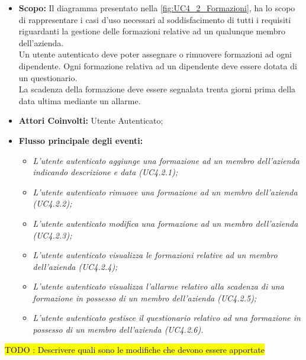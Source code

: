 		\begin{itemize}
			\item \textbf{Scopo:} Il diagramma presentato nella \autoref{fig:UC4_2_Formazioni}, ha lo scopo di rappresentare i casi d'uso necessari al soddisfacimento di tutti i requisiti riguardanti la gestione delle formazioni relative ad un qualunque membro dell'azienda. \\ 
			Un utente autenticato deve poter assegnare o rimuovere formazioni ad ogni dipendente. 
			Ogni formazione relativa ad un dipendente deve essere dotata di un questionario. \\ 
			La scadenza della formazione deve essere segnalata trenta giorni prima della data ultima mediante un allarme.
			\item \textbf{Attori Coinvolti:} Utente Autenticato;
			\item \textbf{Flusso principale degli eventi:} 
			\begin{itemize}
				\item \textit{L'utente autenticato aggiunge una formazione ad un membro dell'azienda indicando descrizione e data (UC4.2.1);}
				\item \textit{L'utente autenticato rimuove una formazione ad un membro dell'azienda (UC4.2.2);}
				\item \textit{L'utente autenticato modifica una formazione ad un membro dell'azienda (UC4.2.3);}
				\item \textit{L'utente autenticato visualizza le formazioni relative ad un membro dell'azienda (UC4.2.4);}
				\item \textit{L'utente autenticato visualizza l'allarme relativo alla scadenza di una formazione in possesso di un membro dell'azienda (UC4.2.5);}
				\item \textit{L'utente autenticato gestisce il questionario relativo ad una formazione in possesso di un membro dell'azienda (UC4.2.6).}
			\end{itemize}
		\end{itemize}
			\hl{TODO : Descrivere quali sono le modifiche che devono essere apportate}
	\newpage	
